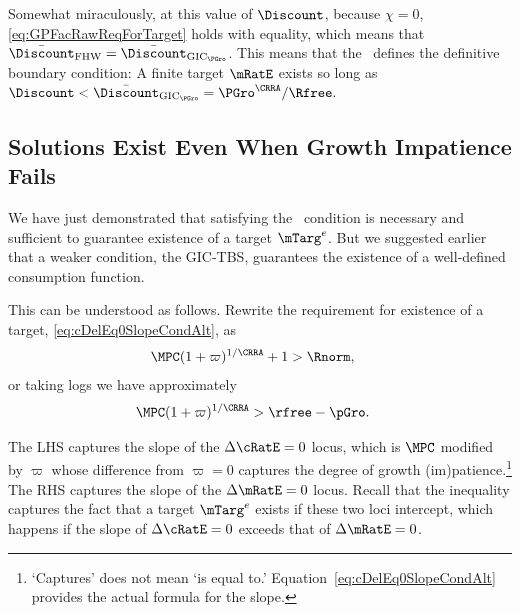 \documentclass{handout}
\begin{document}
Somewhat miraculously, at this value of $\Discount$, because $\chi=0$, \eqref{eq:GPFacRawReqForTarget} holds with equality, which means that $\DiscountMaxGICWhenFHWCTBSHolds=\DiscountMaxGICPGro$.  This means that the \GICPGro~defines the definitive boundary condition:  A finite target $\mRatE$ exists so long as $\Discount < \DiscountMaxGICPGro = \PGro^{\CRRA}/\Rfree.$

\subsection{Solutions Exist Even When Growth Impatience Fails}

We have just demonstrated that satisfying the \GICPGro~condition is necessary and sufficient to guarantee existence of a target $\mTarg^{e}$.  But we suggested earlier that a weaker condition, the GIC-TBS, guarantees the existence of a well-defined consumption function.

This can be understood as follows.  Rewrite the requirement for existence of a target, \eqref{eq:cDelEq0SlopeCondAlt}, as 
\begin{equation}\begin{gathered}\begin{aligned}
  \MPCU (1+\varpi)^{1/\CRRA}+1 & >   \Rnorm  \label{eq:cDelEq0SlopeCondAltAlt}
,\end{aligned}\end{gathered}\end{equation}
or taking logs we have approximately 
\begin{equation}\begin{gathered}\begin{aligned}
  \MPCU (1+\varpi)^{1/\CRRA} & >   \rfree-\pGro \label{eq:cDelEq0SlopeCondLog}
.\end{aligned}\end{gathered}\end{equation}

The LHS captures the slope of the $\dcEqZero$ locus, which is $\MPCU$ modified by $\varpi$ whose difference from $\varpi=0$ captures the degree of growth (im)patience.\footnote{`Captures' does not mean `is equal to.'  Equation~\eqref{eq:cDelEq0SlopeCondAlt} provides the actual formula for the slope.}  The RHS captures the slope of the $\dmEqZero$ locus.  Recall that the inequality captures the fact that a target $\mTarg^{e}$ exists if these two loci intercept, which happens if the slope of $\dcEqZero$ exceeds that of $\dmEqZero$.
\end{document}
